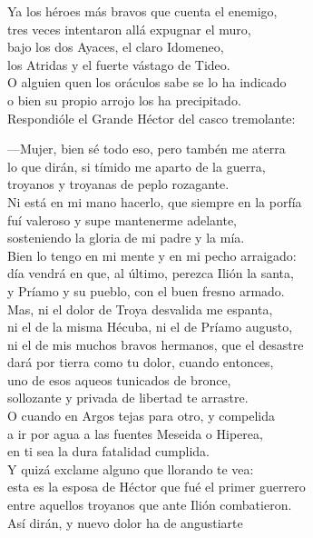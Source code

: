 Ya los héroes más bravos que cuenta el enemigo,\\
tres veces intentaron allá expugnar el muro,\\
bajo los dos Ayaces, el claro Idomeneo,\\
los Atridas y el fuerte vástago de Tideo.\\
O alguien quen los oráculos sabe se lo ha indicado\\
o bien su propio arrojo los ha precipitado.\\
Respondióle el Grande Héctor del casco tremolante:\par
---Mujer, bien sé todo eso, pero tambén me aterra\\
lo que dirán, si tímido me aparto de la guerra,\\
troyanos y troyanas de peplo rozagante.\\
Ni está en mi mano hacerlo, que siempre en la porfía\\
fuí valeroso y supe mantenerme adelante,\\
sosteniendo la gloria de mi padre y la mía.\\
Bien lo tengo en mi mente y en mi pecho arraigado:\\
día vendrá en que, al último, perezca Ilión la santa,\\
y Príamo y su pueblo, con el buen fresno armado.\\
Mas, ni el dolor de Troya desvalida me espanta,\\
ni el de la misma Hécuba, ni el de Príamo augusto,\\
ni el de mis muchos bravos hermanos, que el desastre\\
dará por tierra como tu dolor, cuando entonces,\\
uno de esos aqueos tunicados de bronce,\\
sollozante y privada de libertad te arrastre.\\
O cuando en Argos tejas para otro, y compelida\\
a ir por agua a las fuentes Meseida o Hiperea,\\
en ti sea la dura fatalidad cumplida.\\
Y quizá exclame alguno que llorando te vea:\\
esta es la esposa de Héctor que fué el primer guerrero\\
entre aquellos troyanos que ante Ilión combatieron.\\
Así dirán, y nuevo dolor ha de angustiarte\\
